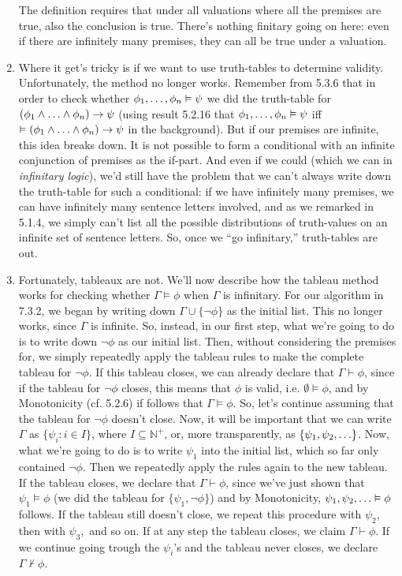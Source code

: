 \begin{enumerate}[\thesection.1]
\begin{itemize}
		\end{itemize}
		The definition requires that under all valuations where all the premises are true, also the conclusion is true. There's nothing finitary going on here: even if there are infinitely many premises, they can all be true under a valuation.
		
		\item Where it get's tricky is if we want to use truth-tables to determine validity. Unfortunately, the method no longer works. Remember from 5.3.6 that in order to check whether $\phi_1,\mathellipsis, \phi_n\vDash \psi$ we did the truth-table for $(\phi_1\land\mathellipsis\land\phi_n)\to\psi$ (using result 5.2.16 that $\phi_1,\mathellipsis, \phi_n\vDash \psi$ iff $\vDash (\phi_1\land\mathellipsis\land\phi_n)\to\psi$ in the background). But if our premises are infinite, this idea breaks down. It is not possible to form a conditional with an infinite conjunction of premises as the if-part. And even if we could (which we can in \emph{infinitary logic}), we'd still have the problem that we can't always write down the truth-table for such a conditional: if we have infinitely many premises, we can have infinitely many sentence letters involved, and as we remarked in 5.1.4, we simply can't list all the possible distributions of truth-values on an infinite set of sentence letters. So, once we ``go infinitary,'' truth-tables are out. 
		
		\item Fortunately, tableaux are not. We'll now describe how the tableau method works for checking whether $\Gamma\vDash\phi$ when $\Gamma$ is infinitary. For our algorithm in 7.3.2, we began by writing down $\Gamma\cup\{\neg\phi\}$ as the initial list. This no longer works, since $\Gamma$ is infinite. So, instead, in our first step, what we're going to do is to write down $\neg\phi$ as our initial list. Then, without considering the premises for, we simply repeatedly apply the tableau rules to make the complete tableau for $\neg\phi$. If this tableau closes, we can already declare that $\Gamma\vdash\phi$, since if the tableau for $\neg\phi$ closes, this means that $\phi$ is valid, i.e. $\emptyset\vDash\phi$, and by Monotonicity (cf. 5.2.6) if follows that $\Gamma\vDash\phi$. So, let's continue assuming that the tableau for $\neg\phi$ doesn't close. Now, it will be important that we can write $\Gamma$ as $\{\psi_i:i\in I\}$, where $I\subseteq\mathbb{N}^+$, or, more transparently, as $\{\psi_1, \psi_2, \mathellipsis\}$. Now, what we're going to do is to write $\psi_1$ into the initial list, which so far only contained $\neg\phi$. Then we repeatedly apply the rules again to the new tableau. If the tableau closes, we declare that $\Gamma\vdash\phi$, since we've just shown that $\psi_1\vDash\phi$ (we did the tableau for $\{\psi_1,\neg\phi\}$) and by Monotonicity, $\psi_1, \psi_2, \mathellipsis\vDash\phi$ follows. If the tableau still doesn't close, we repeat this procedure with $\psi_2$, then with $\psi_3,$ and so on. If at any step the tableau closes, we claim $\Gamma\vdash\phi$. If we continue going trough the $\psi_i$'s and the tableau never closes, we declare $\Gamma\nvdash\phi$.
		

\end{enumerate}
